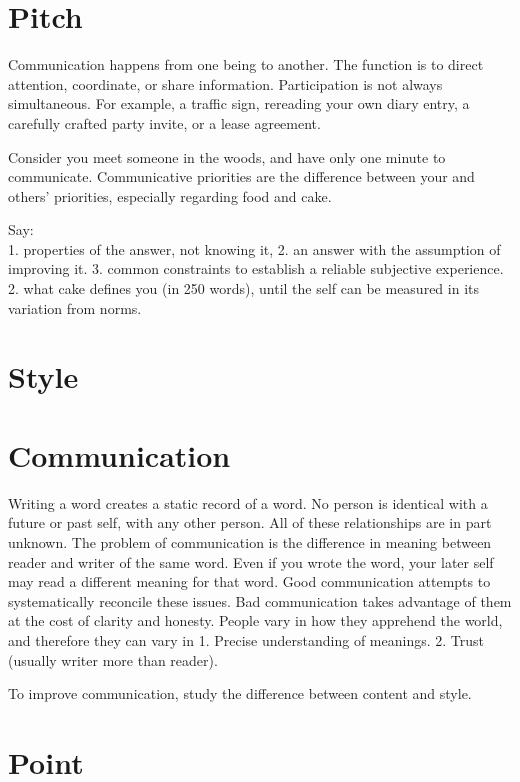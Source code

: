 \documentclass[
]{book}
\begin{document}
\section{Pitch}\label{comm-pitch}

Communication happens from one being to another.
The function is to direct attention, coordinate, or share information.
Participation is not always simultaneous.
For example, a traffic sign, rereading your own diary entry, a carefully crafted party invite, or a lease agreement.

Consider you meet someone in the woods, and have only one minute to communicate.
Communicative priorities are the difference between your and others' priorities, especially regarding food and cake.

Say:\\
1. properties of the answer, not knowing it,
2. an answer with the assumption of improving it.
3. common constraints to establish a reliable subjective
experience.
2. what cake defines you (in 250 words), until the self can be measured in its variation from norms.

\section{Style}\label{style}

\section{Communication}\label{comm-comm}

Writing a word creates a static record of a word.
No person is identical with a future or past self, with any other person.
All of these relationships are in part unknown.
The problem of communication is the difference in meaning between reader and writer of the same word.
Even if you wrote the word, your later self may read a different meaning for that word.
Good communication attempts to systematically reconcile these issues.
Bad communication takes advantage of them at the cost of clarity and honesty.
People vary in how they apprehend the world, and therefore they can vary in
1. Precise understanding of meanings.
2. Trust (usually writer more than reader).

To improve communication, study the difference between content and style.

\section{Point}\label{point}
\end{document}

